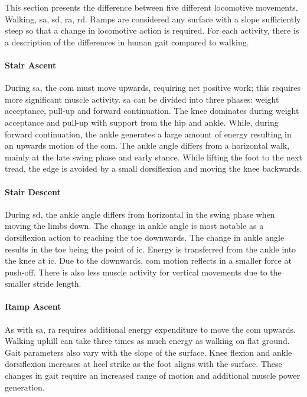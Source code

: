 This section presents the difference between five different locomotive movements, Walking, \acrfull{sa}, \acrfull{sd}, \acrfull{ra}, \acrfull{rd}. Ramps are considered any surface with a slope sufficiently steep so that a change in locomotive action is required. For each activity, there is a description of the differences in human gait compared to walking.

\paragraph{Stair Ascent} During \acrshort{sa}, the \acrshort{com} must move upwards, requiring net positive work; this requires more significant muscle activity. \acrshort{sa} can be divided into three phases: weight acceptance, pull-up and forward continuation. The knee dominates during weight acceptance and pull-up with support from the hip and ankle. While, during forward continuation, the ankle generates a large amount of energy resulting in an upwards motion of the \acrshort{com}. The ankle angle differs from a horizontal walk, mainly at the late swing phase and early stance. While lifting the foot to the next tread, the edge is avoided by a small dorsiflexion and moving the knee backwards.\cite{Svensson2007}

\paragraph{Stair Descent} During \acrshort{sd}, the ankle angle differs from horizontal in the swing phase when moving the limbs down. The change in ankle angle is most notable as a dorsiflexion action to reaching the toe downwards. The change in ankle angle results in the toe being the point of \acrshort{ic}. Energy is transferred from the ankle into the knee at \acrshort{ic}. Due to the downwards, \acrshort{com} motion reflects in a smaller force at push-off. There is also less muscle activity for vertical movements due to the smaller stride length.\cite{Svensson2007}

\paragraph{Ramp Ascent} As with \acrshort{sa}, \acrshort{ra} requires additional energy expenditure to move the \acrshort{com} upwards\cite{Franz2012a}. Walking uphill can take three times as much energy as walking on flat ground\cite{Matsumoto2017}. Gait parameters also vary with the slope of the surface\cite{Kimel-Naor2017}. Knee flexion and ankle dorsiflexion increases at heel strike as the foot aligns with the surface. These changes in gait require an increased range of motion and additional muscle power generation.\cite{McIntosh2006}

